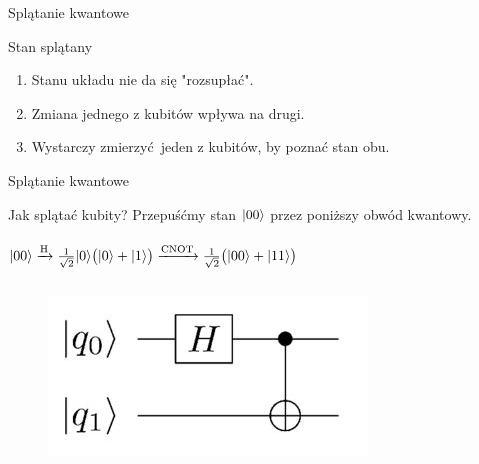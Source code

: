 \documentclass{beamer}
\DeclarePairedDelimiter\ket{\lvert}{\rangle}
\begin{document}
	\begin{frame}{Splątanie kwantowe}
		
		\begin{block}{Stan splątany$  $}
			\vspace{0.5em}
			\begin{enumerate}
			\item Stanu układu nie da się "rozsupłać".
			\item Zmiana jednego z kubitów wpływa na drugi.
			\item Wystarczy zmierzyć jeden z kubitów, by poznać stan obu.
			\end{enumerate}
			\vspace{0.5em}
		\end{block}	
	\end{frame}

	\begin{frame}{Splątanie kwantowe}
		\begin{block}{Jak splątać kubity?}
			\vspace{0.5em}
			\centering
			Przepuśćmy stan $\ket{00}$ przez poniższy obwód kwantowy.\\~\\
			\centering
			$\ket{00}\xrightarrow{\text{H}}
			\frac{1}{\sqrt{2}}\ket{0}\big(\ket{0}+\ket{1} \big) 
			\xrightarrow{\text{CNOT}}
			\frac{1}{\sqrt{2}}\big(\ket{00} + \ket{11} \big)	
			$
			\vspace{0.8em}
		\end{block}
		\vspace{0.8em}
		\begin{columns}
			\begin{column}{0.5\textwidth}
				\begin{center}
					\begin{figure}[h]
					\includegraphics[left]{media/EPR_circuit.jpeg}
					\end{figure}
				\end{center}	
			\end{column}
			

\end{columns}
\end{frame}
\end{document}
